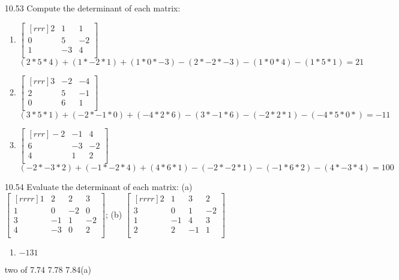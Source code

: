 \documentclass[12pt]{article}
\theoremstyle{definition}
\theoremstyle{plain}
\begin{document}
\begin{enumerate}
\item[10.53]Compute the determinant of each matrix:
	\begin{enumerate}
	\item $\begin{bmatrix}[rrr]2&1&1\\0&5&-2\\1&-3&4\\\end{bmatrix}$
	\[ (2*5*4)+(1*-2*1)+(1*0*-3)-(2*-2*-3)-(1*0*4)-(1*5*1) = 21 \]
	\item $\begin{bmatrix}[rrr]3&-2&-4\\2&5&-1\\0&6&1\\\end{bmatrix}$
	\[ (3*5*1)+(-2*-1*0)+(-4*2*6)-(3*-1*6)-(-2*2*1)-(-4*5*0*)=-11 \]
	\item $\begin{bmatrix}[rrr]-2&-1&4\\6&-3&-2\\4&1&2\\\end{bmatrix}$
	\[ (-2*-3*2)+(-1*-2*4)+(4*6*1)-(-2*-2*1)-(-1*6*2)-(4*-3*4) = 100 \]
	\end{enumerate}

\item[10.54]Evaluate the determinant of each matrix: (a) $\begin{bmatrix}[rrrr]1&2&2&3\\1&0&-2&0\\3&-1&1&-2\\4&-3&0&2\\\end{bmatrix}$; (b) $\begin{bmatrix}[rrrr]2&1&3&2\\3&0&1&-2\\1&-1&4&3\\2&2&-1&1\\\end{bmatrix}$
	\begin{enumerate}
	\item $-131$
	\end{enumerate}

\item[two of 7.74 7.78 7.84(a)]
\end{enumerate}
\end{document}
